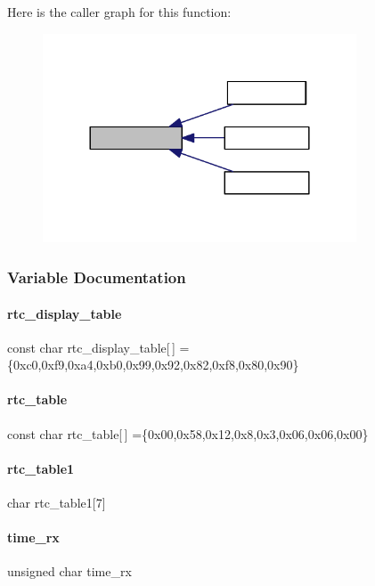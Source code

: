 Here is the caller graph for this function\+:
\nopagebreak
\begin{figure}[H]
\begin{center}
\leavevmode
\includegraphics[width=264pt]{a00044_a67147f11d1f34a31e84b38dd81ccb553_icgraph}
\end{center}
\end{figure}


\subsubsection{Variable Documentation}
\mbox{\label{a00044_a9bb4adf28009b0a805e868850da2cf4b}} 
\paragraph{rtc\+\_\+display\+\_\+table}
{\footnotesize\ttfamily const char rtc\+\_\+display\+\_\+table[$\,$] =\{0xc0,0xf9,0xa4,0xb0,0x99,0x92,0x82,0xf8,0x80,0x90\}}

\mbox{\label{a00044_a021cd228e8beae68982b7c03acf5d060}} 
\paragraph{rtc\+\_\+table}
{\footnotesize\ttfamily const char rtc\+\_\+table[$\,$] =\{0x00,0x58,0x12,0x8,0x3,0x06,0x06,0x00\}}

\mbox{\label{a00044_a3c5af18aaa8845c69095c105f0ca8997}} 
\paragraph{rtc\+\_\+table1}
{\footnotesize\ttfamily char rtc\+\_\+table1[7]}

\mbox{\label{a00044_a878db895116fbbee698e727062540d31}} 
\paragraph{time\+\_\+rx}
{\footnotesize\ttfamily unsigned char time\+\_\+rx}

